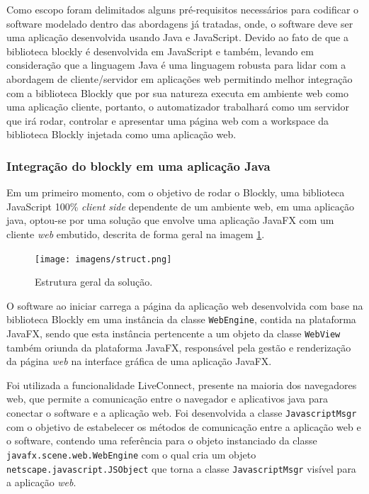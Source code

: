 \documentclass[tg]{mdtufsm}
\begin{document}
                Como escopo foram delimitados alguns pré-requisitos necessários para codificar o software modelado dentro das abordagens já tratadas, onde, o software deve ser uma aplicação desenvolvida usando Java e JavaScript. Devido ao fato de que a biblioteca blockly é desenvolvida em JavaScript e também, levando em consideração que a linguagem Java é uma linguagem robusta para lidar com a abordagem de cliente/servidor em aplicações web permitindo melhor integração com a biblioteca Blockly que por sua natureza executa em ambiente web como uma aplicação cliente, portanto, o automatizador trabalhará como um servidor que irá rodar, controlar e apresentar uma página web com a workspace da biblioteca Blockly injetada como uma aplicação web.

                \subsubsection {Integração do blockly em uma aplicação Java}

                    Em um primeiro momento, com o objetivo de rodar o Blockly, uma biblioteca JavaScript 100\% \emph{client side} dependente de um ambiente web, em uma aplicação java, optou-se por uma solução que envolve uma aplicação JavaFX com um cliente \emph{web} embutido, descrita de forma geral na imagem \ref{fig:struct}.

                    \begin{figure}[!htb]
                        {\centering
                        \texttt{[image: imagens/struct.png]}
                        \caption{Estrutura geral da solução.}
                        \label{fig:struct}}
                    \end{figure}

                    O software ao iniciar carrega a página da aplicação web desenvolvida com base na biblioteca Blockly em uma instância da classe \texttt{WebEngine}, contida na plataforma JavaFX, sendo que esta instância pertencente a um objeto da classe \texttt{WebView} também oriunda da plataforma JavaFX, responsável pela gestão e renderização da página \emph{web} na interface gráfica de uma aplicação JavaFX.

                    Foi utilizada a funcionalidade LiveConnect, presente na maioria dos navegadores web, que permite a comunicação entre o navegador e aplicativos java para conectar o software e a aplicação web. Foi desenvolvida a classe \texttt{JavascriptMsgr} com o objetivo de estabelecer os métodos de comunicação entre a aplicação web e o software, contendo uma referência para o objeto instanciado da classe \texttt{javafx.scene.web.WebEngine} com o qual cria um objeto \texttt{netscape.javascript.JSObject} que torna a classe \texttt{JavascriptMsgr} visível para a aplicação \emph{web}.
\end{document}
